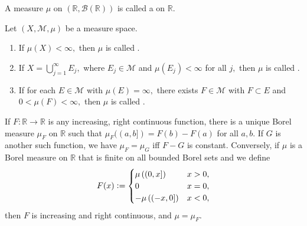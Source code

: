 \documentclass[12pt]{article}	%
\begin{document}
\section{} %
\begin{defn}
	A measure $\mu$ on $(\mathbb{R}, \mathcal{B}(\mathbb{R}))$ is called a  on $\mathbb{R}.$
\end{defn}

\begin{defn}
	Let $(X, \mathcal{M}, \mu)$ be a measure space.
	\begin{enumerate}
		\item If $\mu(X) < \infty,$ then $\mu$ is called .
		\item If $X = \bigcup_{j = 1}^\infty E_j,$ where $E_j \in \mathcal{M}$ and $\mu(E_j) < \infty$ for all $j,$ then $\mu$ is called .
		\item If for each $E \in \mathcal{M}$ with $\mu(E) = \infty,$ there exists $F \in \mathcal{M}$ with $F \subset E$ and $0 < \mu(F) < \infty,$ then $\mu$ is called .
	\end{enumerate}
\end{defn}

\begin{thm}
	If $F : \mathbb{R} \to \mathbb{R}$ is any increasing, right continuous function, there is a unique Borel measure $\mu_F$ on $\mathbb{R}$ such that $\mu_F((a, b]) = F(b) - F(a)$ for all $a, b.$ If $G$ is another such function, we have $\mu_F = \mu_G$ iff $F - G$ is constant. Conversely, if $\mu$ is a Borel measure on $\mathbb{R}$ that is finite on all bounded Borel sets and we define
	\begin{equation*} 
		F(x) \vcentcolon= \begin{cases}
			\mu\left((0, x]\right) & x > 0,\\
			0 & x = 0,\\
			-\mu\left((-x, 0]\right) & x < 0,
		\end{cases}
	\end{equation*}
	then $F$ is increasing and right continuous, and $\mu = \mu_F.$
\end{thm}
\end{document}
